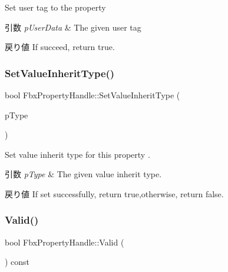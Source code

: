 Set user tag to the property 
\begin{DoxyParams}{引数}
{\em p\+User\+Data} & The given user tag \\
\hline
\end{DoxyParams}
\begin{DoxyReturn}{戻り値}
If succeed, return true. 
\end{DoxyReturn}
\mbox{\label{class_fbx_property_handle_a3f03d6a87ab11bffdd30923485272f4a}} 
\subsubsection{\texorpdfstring{Set\+Value\+Inherit\+Type()}{SetValueInheritType()}}
{\footnotesize\ttfamily bool Fbx\+Property\+Handle\+::\+Set\+Value\+Inherit\+Type (\begin{DoxyParamCaption}\item[{\hyperlink{class_fbx_property_flags_ae3b667a4fcac4b827fa186a698fec2f8}{Fbx\+Property\+Flags\+::\+E\+Inherit\+Type}}]{p\+Type }\end{DoxyParamCaption})}

Set value inherit type for this property . 
\begin{DoxyParams}{引数}
{\em p\+Type} & The given value inherit type. \\
\hline
\end{DoxyParams}
\begin{DoxyReturn}{戻り値}
If set successfully, return true,otherwise, return false. 
\end{DoxyReturn}
\mbox{\label{class_fbx_property_handle_ae9e85fda97a40a94361ed91c6127f5a1}} 
\subsubsection{\texorpdfstring{Valid()}{Valid()}}
{\footnotesize\ttfamily bool Fbx\+Property\+Handle\+::\+Valid (\begin{DoxyParamCaption}{ }\end{DoxyParamCaption}) const}



